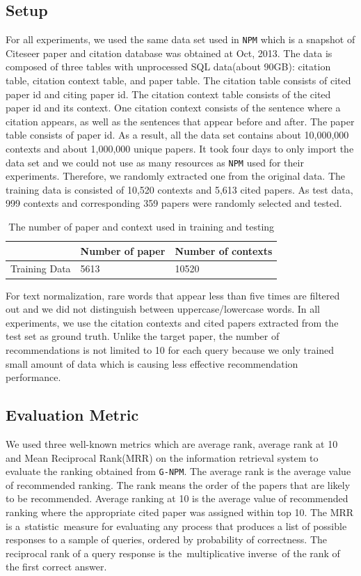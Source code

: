 \documentclass{llncs}
\newcommand{\name}{\texttt{G-NPM}\xspace}
\newcommand{\npm}{\texttt{NPM}\xspace}
\begin{document}
\subsection{Setup}
\label{sec:setup}
For all experiments, we used the same data set used in \npm which is a snapshot of Citeseer paper and citation database was obtained at Oct, 2013. The data is composed of three tables with unprocessed SQL data(about 90GB): citation table, citation context table, and paper table. The citation table consists of cited paper id and citing paper id. The citation context table consists of the cited paper id and its context. One citation context consists of the sentence where a citation appears, as well as the sentences that appear before and after. The paper table consists of paper id. As a result, all the data set contains about 10,000,000 contexts and about 1,000,000 unique papers.
It took four days to only import the data set and we could not use as many resources as \npm used for their experiments. Therefore, we randomly extracted one from the original data. The training data is consisted of 10,520 contexts and 5,613 cited papers. As test data, 999 contexts and corresponding 359 papers were randomly selected and tested.

\begin{table}[ht]
\centering
\begin{tabular}{l || p{} | p{}}
\toprule
& Number of paper & Number of contexts \\
\midrule
Training Data & 5613 & 10520 \\
\bottomrule
\end{tabular}
\caption{The number of paper and context used in training and testing}\label{table:data}
\vspace{-2em}
\end{table}

For text normalization, rare words that appear less than five times are filtered out and we did not distinguish between uppercase/lowercase words. In all experiments, we use the citation contexts and cited papers extracted from the test set as ground truth. Unlike the target paper, the number of recommendations is not limited to 10 for each query because we only trained small amount of data which is causing less effective recommendation performance.

\subsection{Evaluation Metric}
\label{sec:metric}
We used three well-known metrics which are average rank, average rank at 10 and Mean Reciprocal Rank(MRR) on the information retrieval system to evaluate the ranking obtained from \name. The average rank is the average value of recommended ranking. The rank means the order of the papers that are likely to be recommended. Average ranking at 10 is the average value of recommended ranking where the appropriate cited paper was assigned within top 10. The MRR is a statistic measure for evaluating any process that produces a list of possible responses to a sample of queries, ordered by probability of correctness. The reciprocal rank of a query response is the multiplicative inverse of the rank of the first correct answer.
\end{document}
